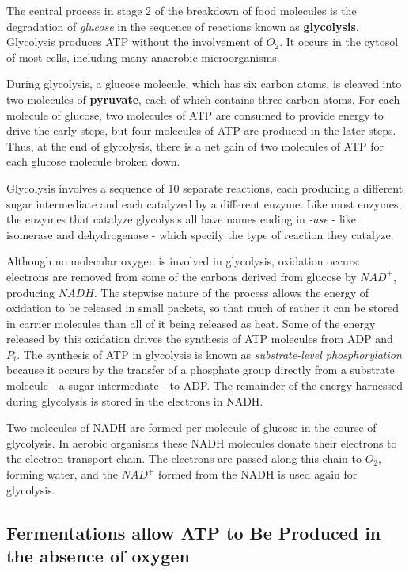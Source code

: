 The central process in stage 2 of the breakdown of food molecules is
the degradation of \textit{glucose} in the sequence of reactions known as \textbf{glycolysis}.
Glycolysis produces ATP without the involvement of $O_2$. It occurs in the cytosol of
most cells, including many anaerobic microorganisms.

During glycolysis, a glucose molecule, which has six carbon atoms, is
cleaved into two molecules of \textbf{pyruvate}, each of which contains three
carbon atoms. For each molecule of glucose, two molecules of ATP are
consumed to provide energy to drive the early steps, but four molecules
of ATP are produced in the later steps. Thus, at the end of glycolysis, there
is a net gain of two molecules of ATP for each glucose molecule broken
down.

Glycolysis involves a sequence of 10 separate reactions, each producing
a different sugar intermediate and each catalyzed by a different enzyme.
Like most enzymes, the enzymes that catalyze glycolysis all have names ending in \textit{-ase} - like
isomerase and dehydrogenase - which specify the type of reaction they
catalyze.

Although no molecular oxygen is involved in glycolysis, oxidation occurs:
electrons are removed from some of the carbons derived from glucose
by $NAD^{+}$, producing $NADH$. The stepwise nature of the process allows
the energy of oxidation to be released in small packets, so that much of
rather it can be stored in carrier molecules than all of it being released
as heat. Some of the energy released by this oxidation
drives the synthesis of ATP molecules from ADP and $P_{i}$. The synthesis
of ATP in glycolysis is known as \textit{substrate-level phosphorylation} because
it occurs by the transfer of a phosphate group directly from a substrate
molecule - a sugar intermediate - to ADP. The remainder of the energy
harnessed during glycolysis is stored in the electrons in NADH.

Two molecules of NADH are formed per molecule of glucose in the
course of glycolysis. In aerobic organisms these NADH molecules donate
their electrons to the electron-transport chain.
The electrons are passed along this chain to $O_2$, forming
water, and the $NAD^{+}$ formed from the NADH is used again for glycolysis.

\subsection{Fermentations allow ATP to Be Produced in the absence of oxygen}

